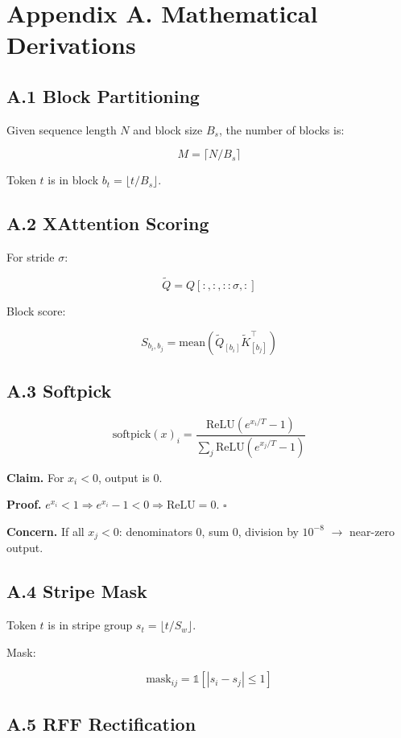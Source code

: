 \section{Appendix A. Mathematical Derivations}

\subsection{A.1 Block Partitioning}

Given sequence length $N$ and block size $B_s$, the number of blocks is:

\[
M = \lceil N / B_s \rceil
\tag{A.1}
\]

Token $t$ is in block $b_t = \lfloor t / B_s \rfloor$.

\subsection{A.2 XAttention Scoring}

For stride $\sigma$:

\[
\tilde{Q} = Q[:, :, ::\sigma, :]
\tag{A.2}
\]

Block score:

\[
S_{b_i, b_j} = \text{mean}(\tilde{Q}_{[b_i]} \tilde{K}_{[b_j]}^\top)
\tag{A.3}
\]

\subsection{A.3 Softpick}

\[
\text{softpick}(x)_i = \frac{\text{ReLU}(e^{x_i/T} - 1)}{\sum_j \text{ReLU}(e^{x_j/T} - 1)}
\tag{A.4}
\]

\textbf{Claim.} For $x_i < 0$, output is 0.

\textbf{Proof.} $e^{x_i} < 1 \Rightarrow e^{x_i} - 1 < 0 \Rightarrow \text{ReLU} = 0$. $\square$

\textbf{Concern.} If all $x_j < 0$: denominators 0, sum 0, division by $10^{-8}$ $\to$ 
near-zero output.

\subsection{A.4 Stripe Mask}

Token $t$ is in stripe group $s_t = \lfloor t / S_w \rfloor$.

Mask:

\[
\text{mask}_{ij} = \mathbb{1}[|s_i - s_j| \leq 1]
\tag{A.5}
\]

\subsection{A.5 RFF Rectification}

